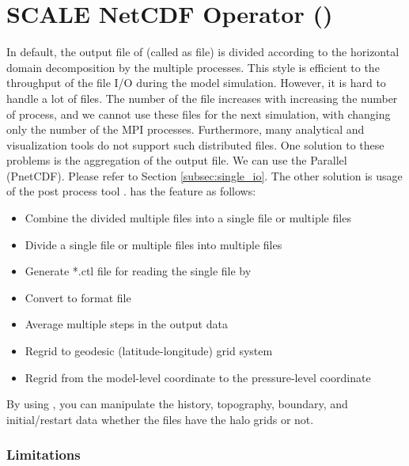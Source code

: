 \section{SCALE NetCDF Operator (\sno)} \label{sec:snoutil}

In default, the output file of \scalerm (called as \scalenetcdf file) is divided according to the horizontal domain decomposition by the multiple processes. This style is efficient to the throughput of the file I/O during the model simulation. However, it is hard to handle a lot of files. The number of the file increases with increasing the number of process, and we cannot use these files for the next simulation, with changing only the number of the MPI processes. Furthermore, many analytical and visualization tools do not support such distributed files. One solution to these problems is the aggregation of the output file. We can use the Parallel \netcdf (PnetCDF). Please refer to Section \ref{subsec:single_io}. The other solution is usage of the post process tool \sno. \sno has the feature as follows:

\begin{itemize}
 \item Combine the divided multiple files into a single file or multiple files
 \item Divide a single file or multiple files into multiple files
 \item Generate *.ctl file for reading the single \Netcdf file by \grads
 \item Convert to \grads format file
 \item Average multiple steps in the output data
 \item Regrid to geodesic (latitude-longitude) grid system
 \item Regrid from the model-level coordinate to the pressure-level coordinate
\end{itemize}

By using \sno, you can manipulate the history, topography, boundary, and initial/restart data whether the files have the halo grids or not.

\subsubsection{Limitations}

